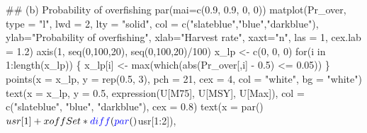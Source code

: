 \documentclass[11pt,]{article}
\newenvironment{Shaded}{}{}
\newcommand{\CommentTok}[1]{\textcolor[rgb]{0.00,0.50,0.00}{#1}}
\newcommand{\ControlFlowTok}[1]{\textcolor[rgb]{0.00,0.00,1.00}{#1}}
\newcommand{\DataTypeTok}[1]{#1}
\newcommand{\DecValTok}[1]{#1}
\newcommand{\FloatTok}[1]{#1}
\newcommand{\KeywordTok}[1]{\textcolor[rgb]{0.00,0.00,1.00}{#1}}
\newcommand{\NormalTok}[1]{#1}
\newcommand{\OperatorTok}[1]{#1}
\newcommand{\StringTok}[1]{\textcolor[rgb]{0.00,0.50,0.50}{#1}}
\begin{document}
\begin{Shaded}
\begin{Highlighting}[]
{{\CommentTok{## (b) Probability of overfishing}
\KeywordTok{par}\NormalTok{(}\DataTypeTok{mai=}\KeywordTok{c}\NormalTok{(}\FloatTok{0.9}\NormalTok{, }\FloatTok{0.9}\NormalTok{, }\DecValTok{0}\NormalTok{, }\DecValTok{0}\NormalTok{))}
\KeywordTok{matplot}\NormalTok{(Pr_over, }\DataTypeTok{type =} \StringTok{"l"}\NormalTok{, }\DataTypeTok{lwd =} \DecValTok{2}\NormalTok{, }\DataTypeTok{lty =} \StringTok{"solid"}\NormalTok{,}
        \DataTypeTok{col =} \KeywordTok{c}\NormalTok{(}\StringTok{"slateblue"}\NormalTok{,}\StringTok{"blue"}\NormalTok{,}\StringTok{"darkblue"}\NormalTok{), }
        \DataTypeTok{ylab=}\StringTok{"Probability of overfishing"}\NormalTok{, }
        \DataTypeTok{xlab=}\StringTok{"Harvest rate"}\NormalTok{, }\DataTypeTok{xaxt=}\StringTok{"n"}\NormalTok{,}
        \DataTypeTok{las =} \DecValTok{1}\NormalTok{, }\DataTypeTok{cex.lab =} \FloatTok{1.2}\NormalTok{)}
\KeywordTok{axis}\NormalTok{(}\DecValTok{1}\NormalTok{, }\KeywordTok{seq}\NormalTok{(}\DecValTok{0}\NormalTok{,}\DecValTok{100}\NormalTok{,}\DecValTok{20}\NormalTok{), }\KeywordTok{seq}\NormalTok{(}\DecValTok{0}\NormalTok{,}\DecValTok{100}\NormalTok{,}\DecValTok{20}\NormalTok{)}\OperatorTok{/}\DecValTok{100}\NormalTok{)}
\NormalTok{x_lp <-}\StringTok{ }\KeywordTok{c}\NormalTok{(}\DecValTok{0}\NormalTok{, }\DecValTok{0}\NormalTok{, }\DecValTok{0}\NormalTok{)}
\ControlFlowTok{for}\NormalTok{(i }\ControlFlowTok{in} \DecValTok{1}\OperatorTok{:}\KeywordTok{length}\NormalTok{(x_lp)) \{}
\NormalTok{  x_lp[i] <-}\StringTok{ }\KeywordTok{max}\NormalTok{(}\KeywordTok{which}\NormalTok{(}\KeywordTok{abs}\NormalTok{(Pr_over[,i] }\OperatorTok{-}\StringTok{ }\FloatTok{0.5}\NormalTok{) }\OperatorTok{<=}\StringTok{ }\FloatTok{0.05}\NormalTok{))}
\NormalTok{\}}
\KeywordTok{points}\NormalTok{(}\DataTypeTok{x =}\NormalTok{ x_lp, }\DataTypeTok{y =} \KeywordTok{rep}\NormalTok{(}\FloatTok{0.5}\NormalTok{, }\DecValTok{3}\NormalTok{), }\DataTypeTok{pch =} \DecValTok{21}\NormalTok{, }\DataTypeTok{cex =} \DecValTok{4}\NormalTok{,}
       \DataTypeTok{col =} \StringTok{"white"}\NormalTok{, }\DataTypeTok{bg =} \StringTok{"white"}\NormalTok{)}
\KeywordTok{text}\NormalTok{(}\DataTypeTok{x =}\NormalTok{ x_lp, }\DataTypeTok{y =} \FloatTok{0.5}\NormalTok{, }\KeywordTok{expression}\NormalTok{(U[M75], U[MSY], U[Max]),}
     \DataTypeTok{col =} \KeywordTok{c}\NormalTok{(}\StringTok{"slateblue"}\NormalTok{, }\StringTok{"blue"}\NormalTok{, }\StringTok{"darkblue"}\NormalTok{), }\DataTypeTok{cex =} \FloatTok{0.8}\NormalTok{)}
\KeywordTok{text}\NormalTok{(}\DataTypeTok{x =} \KeywordTok{par}\NormalTok{()}\OperatorTok{$}\NormalTok{usr[}\DecValTok{1}\NormalTok{] }\OperatorTok{+}\StringTok{ }\NormalTok{xoffSet }\OperatorTok{*}\StringTok{ }\KeywordTok{diff}\NormalTok{(}\KeywordTok{par}\NormalTok{()}\OperatorTok{$}\NormalTok{usr[}\DecValTok{1}\OperatorTok{:}\DecValTok{2}\NormalTok{]),}
}}
\end{Highlighting}
\end{Shaded}
\end{document}
